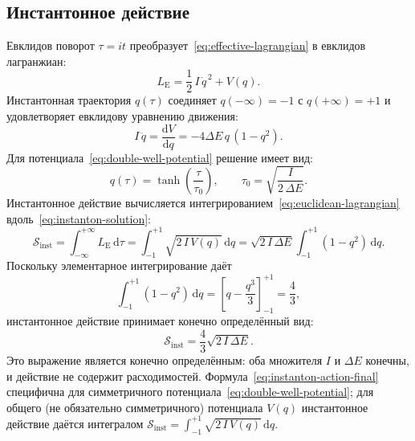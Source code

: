 \documentclass[12pt,a4paper,preprint]{elsarticle}
\begin{document}
        \subsection{Инстантонное действие}\label{subsec:instanton-action}
            Евклидов поворот $\tau = it$ преобразует~\eqref{eq:effective-lagrangian} в евклидов лагранжиан:
            \begin{equation}
                L_{\mathrm{E}} = \frac{1}{2}\,I\,\dot{q}^{\,2} + V(q).
                \label{eq:euclidean-lagrangian}
            \end{equation}
            Инстантонная траектория $q(\tau)$ соединяет $q(-\infty) = -1$ с $q(+\infty) = +1$ и удовлетворяет евклидову уравнению движения:
            \begin{equation}
                I\,\ddot{q} = \frac{\mathrm{d}V}{\mathrm{d}q} = -4\Delta E\,q\,(1 - q^{2}).
                \label{eq:euclidean-eom}
            \end{equation}
            Для потенциала~\eqref{eq:double-well-potential} решение имеет вид:
            \begin{equation}
                q(\tau) = \tanh\left(\frac{\tau}{\tau_{0}}\right), \qquad \tau_{0} = \sqrt{\frac{I}{2\,\Delta E}}.
                \label{eq:instanton-solution}
            \end{equation}
            Инстантонное действие вычисляется интегрированием~\eqref{eq:euclidean-lagrangian} вдоль~\eqref{eq:instanton-solution}:
            \begin{equation}
                \mathcal{S}_{\mathrm{inst}} = \int_{-\infty}^{+\infty} L_{\mathrm{E}}\,\mathrm{d}\tau = \int_{-1}^{+1}\sqrt{2\,I\,V(q)}\,\mathrm{d}q = \sqrt{2\,I\,\Delta E} \int_{-1}^{+1} (1 - q^{2})\,\mathrm{d}q.
                \label{eq:instanton-action-integral}
            \end{equation}
            Поскольку элементарное интегрирование даёт
            \begin{equation}
                \int_{-1}^{+1} (1 - q^{2})\,\mathrm{d}q = \left[ q - \frac{q^{3}}{3} \right]_{-1}^{+1} = \frac{4}{3},
                \label{eq:q-integral}
            \end{equation}
            инстантонное действие принимает конечно определённый вид:
            \begin{equation}
                \mathcal{S}_{\mathrm{inst}} = \frac{4}{3}\sqrt{2\,I\,\Delta E}.
                \label{eq:instanton-action-final}
            \end{equation}
            Это выражение является конечно определённым: оба множителя $I$ и $\Delta E$ конечны, и действие не содержит расходимостей. Формула~\eqref{eq:instanton-action-final} специфична для симметричного потенциала~\eqref{eq:double-well-potential}; для общего (не обязательно симметричного) потенциала $V(q)$ инстантонное действие даётся интегралом $\mathcal{S}_{\mathrm{inst}} = \int_{-1}^{+1}\sqrt{2\,I\,V(q)}\,\mathrm{d}q$.
\end{document}
